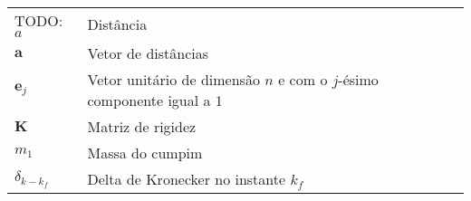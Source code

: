 \begin{longtable}{ll}
TODO: 
$a$ & Distância\\
$\textbf{a}$ & Vetor de distâncias\\
$\textbf{e}_{j}$ & Vetor unitário de dimensão $n$ e com o $j$-ésimo componente igual a $1$ \\
$\textbf{K}$ & Matriz de rigidez\\
$m_1$ & Massa do cumpim\\
$\delta_{k-k_f}$ & Delta de Kronecker no instante $k_f$\\

\end{longtable}

